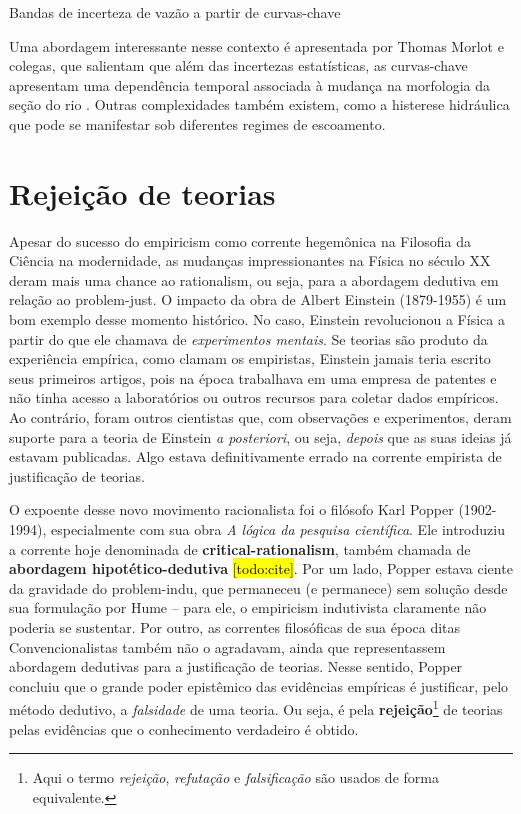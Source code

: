 \documentclass[./main.tex]{subfiles}
\begin{document}
\begin{simplebox}[
    float=htb,
    label={destaque_curvas_chave},
    nameref={Curvas-chave}
    ]{Bandas de incerteza de vazão a partir de curvas-chave}
\begin{minipage}[t]{\linewidth}
    \par Uma abordagem interessante nesse contexto é apresentada por Thomas Morlot e colegas, que salientam que além das incertezas estatísticas, as curvas-chave apresentam uma dependência temporal associada à mudança na morfologia da seção do rio \cite{Morlot2014}. Outras complexidades também existem, como a histerese hidráulica que pode se manifestar sob diferentes regimes de escoamento.    
    \end{minipage}
\label{box:rating-curve}
\normalsize
\end{simplebox}

\section{Rejeição de teorias} \label{sec:epis:popper}

\par Apesar do sucesso do \gls{empiricism} como corrente hegemônica na Filosofia da Ciência na modernidade, as mudanças impressionantes na Física no século XX deram mais uma chance ao \gls{rationalism}, ou seja, para a abordagem dedutiva em relação ao \gls{problem-just}. O impacto da obra de Albert Einstein (1879-1955) é um bom exemplo desse momento histórico. No caso, Einstein revolucionou a Física a partir do que ele chamava de \textit{experimentos mentais}. Se teorias são produto da experiência empírica, como clamam os empiristas, Einstein jamais teria escrito seus primeiros artigos, pois na época trabalhava em uma empresa de patentes e não tinha acesso a laboratórios ou outros recursos para coletar dados empíricos. Ao contrário, foram outros cientistas que, com observações e experimentos, deram suporte para a \gls{teoria} de Einstein \textit{a posteriori}, ou seja, \textit{depois} que as suas ideias já estavam publicadas. Algo estava definitivamente errado na corrente empirista de justificação de teorias.

\par O expoente desse novo movimento racionalista foi o filósofo Karl Popper (1902-1994), especialmente com sua obra \textit{A lógica da pesquisa científica}. Ele introduziu a corrente hoje denominada de \textbf{\gls{critical-rationalism}}, também chamada de \textbf{abordagem hipotético-dedutiva} \hl{[todo:cite]}. Por um lado, Popper estava ciente da gravidade do \gls{problem-indu}, que permaneceu (e permanece) sem solução desde sua formulação por Hume – para ele, o \gls{empiricism} indutivista claramente não poderia se sustentar. Por outro, as correntes filosóficas de sua época ditas Convencionalistas também não o agradavam, ainda que representassem abordagem dedutivas para a justificação de teorias. Nesse sentido, Popper concluiu que o grande poder epistêmico das evidências empíricas é justificar, pelo método dedutivo, a \textit{falsidade} de uma \gls{teoria}. Ou seja, é pela \textbf{rejeição}\footnote{Aqui o termo \textit{rejeição}, \textit{refutação} e \textit{falsificação} são usados de forma equivalente.} de teorias pelas evidências que o conhecimento verdadeiro é obtido.
\end{document}

